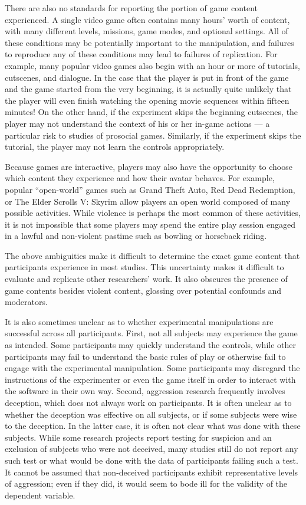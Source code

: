 There are also no standards for reporting the portion of game content experienced. A single video game often contains many hours’ worth of content, with many different levels, missions, game modes, and optional settings. All of these conditions may be potentially important to the manipulation, and failures to reproduce any of these conditions may lead to failures of replication. For example, many popular video games also begin with an hour or more of tutorials, cutscenes, and dialogue. In the case that the player is put in front of the game and the game started from the very beginning, it is actually quite unlikely that the player will even finish watching the opening movie sequences within fifteen minutes! On the other hand, if the experiment skips the beginning cutscenes, the player may not understand the context of his or her in-game actions --- a particular risk to studies of prosocial games. Similarly, if the experiment skips the tutorial, the player may not learn the controls appropriately. 

Because games are interactive, players may also have the opportunity to choose which content they experience and how their avatar behaves. For example, popular “open-world” games such as Grand Theft Auto, Red Dead Redemption, or The Elder Scrolls V: Skyrim allow players an open world composed of many possible activities. While violence is perhaps the most common of these activities, it is not impossible that some players may spend the entire play session engaged in a lawful and non-violent pastime such as bowling or horseback riding.

The above ambiguities make it difficult to determine the exact game content that participants experience in most studies. This uncertainty makes it difficult to evaluate and replicate other researchers' work. It also obscures the presence of game contents besides violent content, glossing over potential confounds and moderators.

It is also sometimes unclear as to whether experimental manipulations are successful across all participants. First, not all subjects may experience the game as intended. Some participants may quickly understand the controls, while other participants may fail to understand the basic rules of play or otherwise fail to engage with the experimental manipulation. Some participants may disregard the instructions of the experimenter or even the game itself in order to interact with the software in their own way. Second, aggression research frequently involves deception, which does not always work on participants. It is often unclear as to whether the deception was effective on all subjects, or if some subjects were wise to the deception. In the latter case, it is often not clear what was done with these subjects. While some research projects report testing for suspicion and an exclusion of subjects who were not deceived, many studies still do not report any such test or what would be done with the data of participants failing such a test. It cannot be assumed that non-deceived participants exhibit representative levels of aggression; even if they did, it would seem to bode ill for the validity of the dependent variable.

